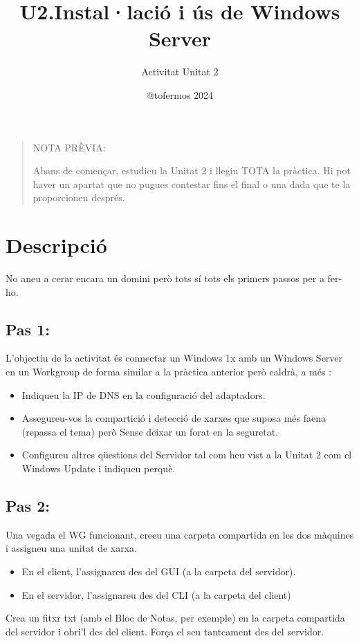 \documentclass[
  a4paper,
]{article}
\title{U2.Instal·lació i ús de Windows Server}
\subtitle{Activitat Unitat 2}
\author{@tofermos 2024}
\date{}
\providecommand{\tightlist}{%
  \setlength{\itemsep}{0pt}\setlength{\parskip}{0pt}}
\begin{document}
\maketitle

{
\setcounter{tocdepth}{2}
\tableofcontents
}
\newpage
\renewcommand\tablename{Tabla}

\begin{quote}
NOTA PRÈVIA:

Abans de començar, estudieu la Unitat 2 i llegiu TOTA la pràctica. Hi
pot haver un apartat que no pugues contestar fins el final o una dada
que te la proporcionen després.
\end{quote}

\section{Descripció}\label{descripciuxf3}

No aneu a cerar encara un domini però tots sí tots els primers passos
per a fer-ho.

\subsection{Pas 1:}\label{pas-1}

L'objectiu de la activitat és connectar un Windows 1x amb un Windows
Server en un Workgroup de forma similar a la pràctica anterior però
caldrà, a més :

\begin{itemize}
\tightlist
\item
  Indiqueu la IP de DNS en la configuració del adaptadors.
\item
  Assegureu-vos la compartició i detecció de xarxes que suposa més faena
  (repassa el tema) però Sense deixar un forat en la seguretat.
\item
  Configureu altres qüestions del Servidor tal com heu vist a la Unitat
  2 com el Windows Update i indiqueu perquè.
\end{itemize}

\subsection{Pas 2:}\label{pas-2}

Una vegada el WG funcionant, creeu una carpeta compartida en les dos
màquines i assigneu una unitat de xarxa.

\begin{itemize}
\item
  En el client, l'assignareu des del GUI (a la carpeta del servidor).
\item
  En el servidor, l'assignareu des del CLI (a la carpeta del client)
\end{itemize}

Crea un fitxr txt (amb el Bloc de Notas, per exemple) en la carpeta
compartida del servidor i obri'l des del client. Força el seu tantcament
des del servidor.
\end{document}
